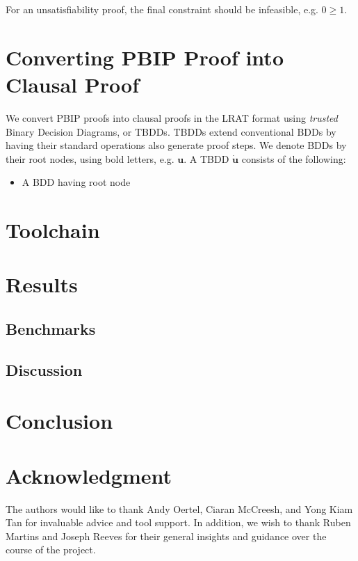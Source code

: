 \message{ !name(FMCAD2024.tex)}\documentclass{fmcad}
\begin{document}
For an unsatisfiability proof, the final constraint should be infeasible, e.g. $0 \geq 1$.



\section{Converting PBIP Proof into Clausal Proof }
We convert PBIP proofs into clausal proofs in the LRAT format using \textit{trusted} Binary
Decision Diagrams, or TBDDs. TBDDs extend conventional BDDs by having their standard operations
also generate proof steps. We denote BDDs by their root nodes, using bold letters, e.g.
$\mathbf{u}$. A TBDD $\dot{\mathbf{u}}$ consists of the following:

\begin{itemize}
\item A BDD having root node $$
\end{itemize}

\section{Toolchain}
\lipsum
\section{Results}

\subsection{Benchmarks}
\lipsum[2]
\subsection{Discussion}
\lipsum[2]

\section{Conclusion}
\lipsum

\section*{Acknowledgment}

The authors would like to thank Andy Oertel, Ciaran McCreesh, and Yong Kiam Tan for invaluable
advice and tool support. In addition, we wish to thank Ruben Martins and Joseph Reeves for their
general insights and guidance over the course of the project.


\end{document}
